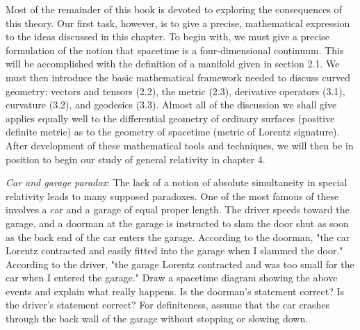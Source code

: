 Most of the remainder of this book is devoted to exploring the consequences of this theory. Our first task, however, is to give a precise, mathematical expression to the ideas discussed in this chapter. To begin with, we must give a precise formulation of the notion that spacetime is a four-dimensional continuum. This will be accomplished with the definition of a manifold given in section 2.1. We must then introduce the basic mathematical framework needed to discuss curved geometry: vectors and tensors (2.2), the metric (2.3), derivative operators (3.1), curvature (3.2), and geodesics (3.3). Almost all of the discussion we shall give applies equally well to the differential geometry of ordinary surfaces (positive definite metric) as to the geometry of spacetime (metric of Lorentz signature). After development of these mathematical tools and techniques, we will then be in position to begin our study of general relativity in chapter 4.

\begin{problem}
    \emph{Car and garage paradox}: The lack of a notion of absolute simultaneity in special relativity leads to many supposed paradoxes. One of the most famous of these involves a car and a garage of equal proper length. The driver speeds toward the garage, and a doorman at the garage is instructed to slam the door shut as soon as the back end of the car enters the garage. According to the doorman, "the car Lorentz contracted and easily fitted into the garage when I slammed the door." According to the driver, "the garage Lorentz contracted and was too small for the car when I entered the garage." Draw a spacetime diagram showing the above events and explain what really happens. Is the doorman's statement correct? Is the driver's statement correct? For definiteness, assume that the car crashes through the back wall of the garage without stopping or slowing down.
\end{problem}

